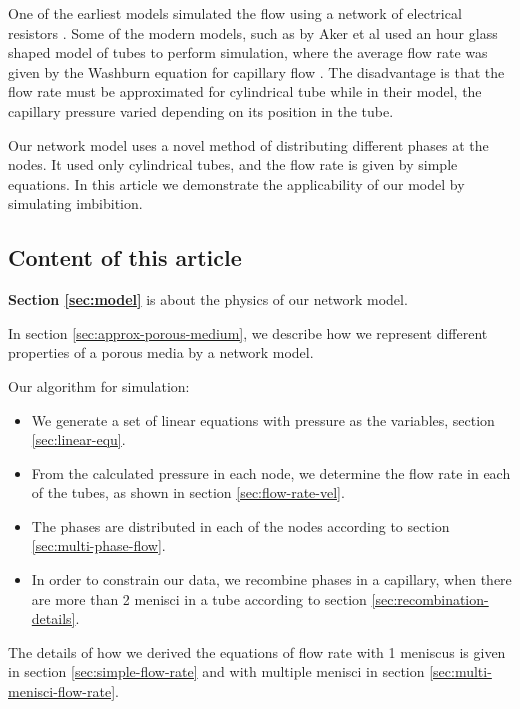 \documentclass{crm-article}
\begin{document}
			One of the earliest models simulated the flow using a network of electrical resistors \cite{fatt1956network}. Some of the modern models, such as by Aker et al \cite{aker1998two} used an hour glass shaped model of tubes  to perform simulation, where the average flow rate was given by the Washburn equation for capillary flow \cite{washburn1921dynamics}. The disadvantage is that the flow rate must be approximated for cylindrical tube while in their model, the capillary pressure varied depending on its position in the tube.
			
			Our network model uses a novel method of distributing different phases at the nodes. It used only cylindrical tubes, and the flow rate is given by simple equations. In this article we demonstrate the applicability of our model by simulating imbibition.
			
		\subsection{Content of this article}
			\textbf{Section \ref{sec:model}} is about the physics of our network model.
			
			In section \ref{sec:approx-porous-medium}, we describe how we represent different properties of a porous media by a network model.
			
			Our algorithm for simulation:
			\begin{itemize}
				\item We generate a set of linear equations with pressure as the variables, section \ref{sec:linear-equ}.
				
				\item From the calculated pressure in each node, we determine the flow rate in each of the tubes, as shown in section \ref{sec:flow-rate-vel}.
				
				\item The phases are distributed in each of the nodes according to section \ref{sec:multi-phase-flow}.
				
				\item In order to constrain our data, we recombine phases in a capillary, when there are more than 2 menisci in a tube according to section \ref{sec:recombination-details}.
			\end{itemize}
			
			The details of how we derived the equations of flow rate with 1 meniscus is given in section \ref{sec:simple-flow-rate} and with multiple menisci in section \ref{sec:multi-menisci-flow-rate}.
			
\end{document}
